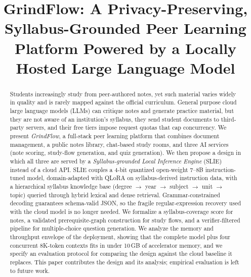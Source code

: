 \documentclass[conference]{IEEEtran}
\begin{document}
\title{GrindFlow: A Privacy-Preserving, Syllabus-Grounded Peer Learning Platform Powered by a Locally Hosted Large Language Model}

\author{
}

\maketitle

\begin{abstract}
Students increasingly study from peer-authored notes, yet such material varies
widely in quality and is rarely mapped against the official curriculum. General
purpose cloud large language models (LLMs) can critique notes and generate
practice material, but they are not aware of an institution's syllabus,
they send student documents to third-party servers, and their free tiers impose
request quotas that cap concurrency. We present \emph{GrindFlow}, a full-stack
peer learning platform that combines document management, a public notes
library, chat-based study rooms, and three AI services (note scoring,
study-flow generation, and quiz generation). We then propose a design in
which all three are served by a \emph{Syllabus-grounded Local Inference
Engine} (SLIE) instead of a cloud API. SLIE couples a 4-bit quantized open-weight 7--8B instruction-tuned model,
domain-adapted with QLoRA on syllabus-derived instruction data, with a
hierarchical syllabus knowledge base (degree $\rightarrow$ year $\rightarrow$
subject $\rightarrow$ unit $\rightarrow$ topic) queried through hybrid lexical and
dense retrieval. Grammar-constrained decoding guarantees schema-valid JSON, so
the fragile regular-expression recovery used with the cloud model is no longer
needed. We formalize a syllabus-coverage score for notes, a validated
prerequisite-graph construction for study flows, and a verifier-filtered
pipeline for multiple-choice question generation. We analyze the memory and
throughput envelope of the deployment, showing that the complete model plus
four concurrent 8K-token contexts fits in under 10\,GB of accelerator memory,
and we specify an evaluation protocol for comparing the design against the
cloud baseline it replaces. This paper contributes the design and its
analysis; empirical evaluation is left to future work.
\end{abstract}
\end{document}
